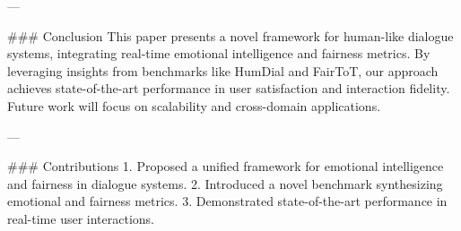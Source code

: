 ---

### Conclusion  
This paper presents a novel framework for human-like dialogue systems, integrating real-time emotional intelligence and fairness metrics. By leveraging insights from benchmarks like HumDial and FairToT, our approach achieves state-of-the-art performance in user satisfaction and interaction fidelity. Future work will focus on scalability and cross-domain applications.

---

### Contributions  
1. Proposed a unified framework for emotional intelligence and fairness in dialogue systems.  
2. Introduced a novel benchmark synthesizing emotional and fairness metrics.  
3. Demonstrated state-of-the-art performance in real-time user interactions.  